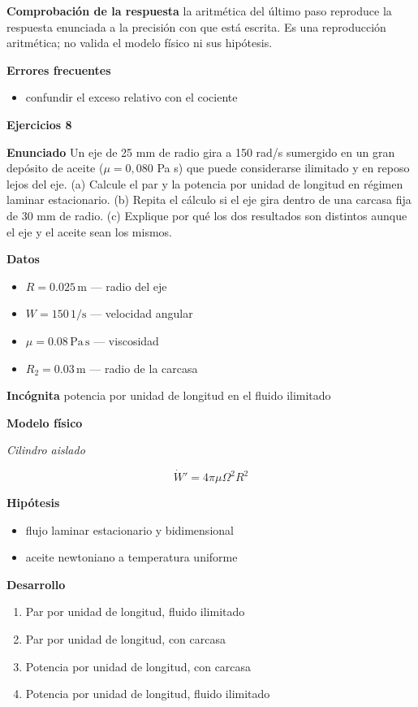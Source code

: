 \documentclass[10pt,openany]{book}
\begin{document}
\noindent\textbf{Comprobación de la respuesta} la aritmética del último paso reproduce la respuesta enunciada a la precisión con que está escrita. Es una reproducción aritmética; no valida el modelo físico ni sus hipótesis.

\noindent\textbf{Errores frecuentes}
\begin{itemize}
\item confundir el exceso relativo con el cociente
\end{itemize}

\noindent\textbf{Ejercicios 8}

\noindent\textbf{Enunciado}
Un eje de 25 mm de radio gira a 150 rad/s sumergido en un gran depósito de aceite (\(\mu = 0{,}080\) Pa s) que puede considerarse ilimitado y en reposo lejos del eje. (a) Calcule el par y la potencia por unidad de longitud en régimen laminar estacionario. (b) Repita el cálculo si el eje gira dentro de una carcasa fija de 30 mm de radio. (c) Explique por qué los dos resultados son distintos aunque el eje y el aceite sean los mismos.

\noindent\textbf{Datos}
\begin{itemize}
\item $R = 0.025\,\mathrm{m}$ — radio del eje
\item $W = 150\,\mathrm{1/s}$ — velocidad angular
\item $\mu = 0.08\,\mathrm{Pa}\,\mathrm{s}$ — viscosidad
\item $R_{2} = 0.03\,\mathrm{m}$ — radio de la carcasa
\end{itemize}

\noindent\textbf{Incógnita}
potencia por unidad de longitud en el fluido ilimitado

\noindent\textbf{Modelo físico}

\noindent\textit{Cilindro aislado}

\[
\dot W' = 4\pi\mu\Omega^{2}R^{2}
\]

\noindent\textbf{Hipótesis}
\begin{itemize}
\item flujo laminar estacionario y bidimensional
\item aceite newtoniano a temperatura uniforme
\end{itemize}

\noindent\textbf{Desarrollo}
\begin{enumerate}
\item
Par por unidad de longitud, fluido ilimitado
\item
Par por unidad de longitud, con carcasa
\item
Potencia por unidad de longitud, con carcasa
\item
Potencia por unidad de longitud, fluido ilimitado
\end{enumerate}
\end{document}
